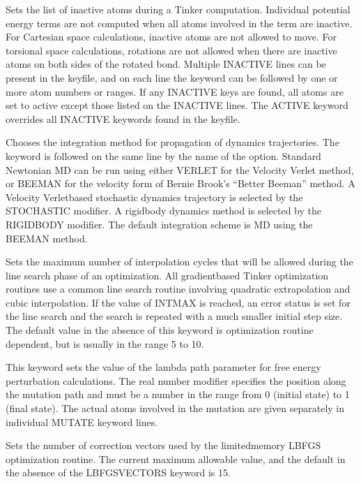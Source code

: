 \documentclass[letterpaper,11pt,english]{sphinxmanual}
\begin{document}
  Sets the list of inactive atoms during a Tinker computation. Individual potential energy terms are not computed when all atoms involved in the term are inactive. For Cartesian space calculations, inactive atoms are not allowed to move. For torsional space calculations, rotations are not allowed when there are inactive atoms on both sides of the rotated bond. Multiple INACTIVE lines can be present in the keyfile, and on each line the keyword can be followed by one or more atom numbers or ranges. If any INACTIVE keys are found, all atoms are set to active except those listed on the INACTIVE lines. The ACTIVE keyword overrides all INACTIVE keywords found in the keyfile.

  Chooses the integration method for propagation of dynamics trajectories. The keyword is followed on the same line by the name of the option. Standard Newtonian MD can be run using either VERLET for the Velocity Verlet method, or BEEMAN for the velocity form of Bernie Brook’s “Better Beeman” method. A Velocity Verlet\sphinxhyphen{}based stochastic dynamics trajectory is selected by the STOCHASTIC modifier. A rigid\sphinxhyphen{}body dynamics method is selected by the RIGIDBODY modifier. The default integration scheme is MD using the BEEMAN method.

  Sets the maximum number of interpolation cycles that will be allowed during the line search phase of an optimization. All gradient\sphinxhyphen{}based Tinker optimization routines use a common line search routine involving quadratic extrapolation and cubic interpolation. If the value of INTMAX is reached, an error status is set for the line search and the search is repeated with a much smaller initial step size. The default value in the absence of this keyword is optimization routine dependent, but is usually in the range 5 to 10.

  This keyword sets the value of the lambda path parameter for free energy perturbation calculations. The real number modifier specifies the position along the mutation path and must be a number in the range from 0 (initial state) to 1 (final state). The actual atoms involved in the mutation are given separately in individual MUTATE keyword lines.

  Sets the number of correction vectors used by the limited\sphinxhyphen{}memory L\sphinxhyphen{}BFGS optimization routine. The current maximum allowable value, and the default in the absence of the LBFGS\sphinxhyphen{}VECTORS keyword is 15.
\end{document}
